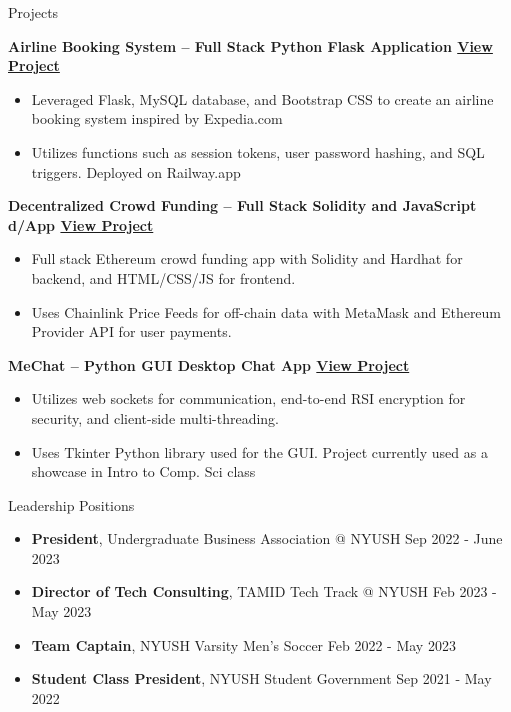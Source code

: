 \documentclass{cv} %
\begin{document}
\begin{rSection}{Projects}

	\textbf{Airline Booking System – Full Stack Python Flask Application \href{https://github.com/larry-lime/airline-ticket-system}{View Project}}
	\begin{itemize}
		\item Leveraged Flask, MySQL database, and Bootstrap CSS to create an airline booking system inspired by Expedia.com
		\item Utilizes functions such as session tokens, user password hashing, and SQL triggers. Deployed on Railway.app
	\end{itemize}

	\textbf{Decentralized Crowd Funding – Full Stack Solidity and JavaScript d/App \href{https://lawrencelim.xyz/project/hh-fund-me/}{View Project}}
	\begin{itemize}
		\item Full stack Ethereum crowd funding app with Solidity and Hardhat for backend, and HTML/CSS/JS for frontend.
		\item Uses Chainlink Price Feeds for off-chain data with MetaMask and Ethereum Provider API for user payments.
	\end{itemize}

	\textbf{MeChat – Python GUI Desktop Chat App \href{https://lawrencelim.xyz/project/mechat/}{View Project}}
	\begin{itemize}
		\item Utilizes web sockets for communication, end-to-end RSI encryption for security, and client-side multi-threading.
		\item Uses Tkinter Python library used for the GUI. Project currently used as a showcase in Intro to Comp. Sci class
	\end{itemize}

\end{rSection}

\begin{rSection}{Leadership Positions}
	\begin{itemize}
		\item \textbf{President}{, Undergraduate Business Association @ NYUSH} \hfill Sep 2022 - June 2023
		\item \textbf{Director of Tech Consulting}{, TAMID Tech Track @ NYUSH} \hfill Feb 2023 - May 2023
		\item \textbf{Team Captain}{, NYUSH Varsity Men's Soccer} \hfill Feb 2022 - May 2023
		\item \textbf{Student Class President}{, NYUSH Student Government} \hfill Sep 2021 - May 2022
	\end{itemize}
\end{rSection}
\end{document}
